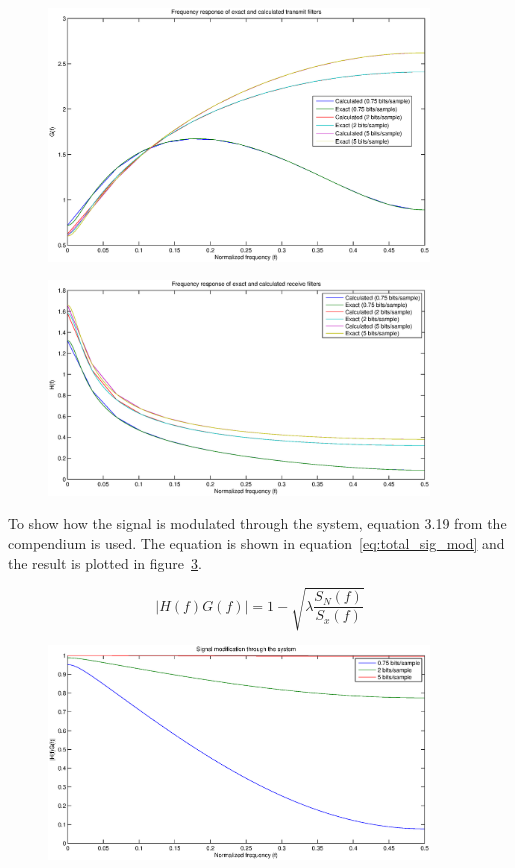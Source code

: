 	\begin{figure}[H]
	  \centering
	  \includegraphics[width=0.9\textwidth]{img/Oppgave2b_freq_G}
	  \label{fig:freq_comp_G}
	\end{figure}
	
	\begin{figure}[H]
	  \centering
	  \includegraphics[width=0.9\textwidth]{img/Oppgave2b_freq_H}
	  \label{fig:freq_comp_H}
	\end{figure}
	
	To show how the signal is modulated through the system, equation 3.19 from the compendium is used. The equation is shown in equation~\ref{eq:total_sig_mod} and the result is plotted in figure~\ref{fig:signal_mod_xy}.
	
	\begin{equation}
		|H(f)G(f)|=1-\sqrt{\lambda \frac{S_N(f)}{S_x(f)}}
		\label{eq:total_sig_mod}
	\end{equation}
	
	\begin{figure}[H]
	  \centering
	  \includegraphics[width=0.9\textwidth]{img/Oppgave2b_signal_mod_x_y}
	  \label{fig:signal_mod_xy}
	\end{figure}


